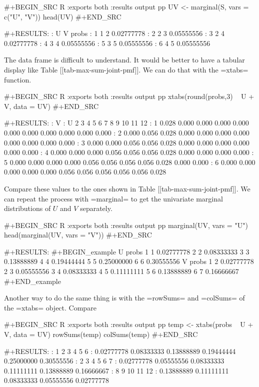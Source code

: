 #+BEGIN_SRC R :exports both :results output pp 
UV <- marginal(S, vars = c("U", "V"))
head(UV)
#+END_SRC

#+RESULTS:
:   U V      probs
: 1 1 2 0.02777778
: 2 2 3 0.05555556
: 3 2 4 0.02777778
: 4 3 4 0.05555556
: 5 3 5 0.05555556
: 6 4 5 0.05555556

The data frame is difficult to understand. It would be better to have
a tabular display like Table [[tab-max-sum-joint-pmf]]. We can do that with
the =xtabs= function.

#+BEGIN_SRC R :exports both :results output pp 
xtabs(round(probs,3) ~ U + V, data = UV)
#+END_SRC

#+RESULTS:
:    V
: U       2     3     4     5     6     7     8     9    10    11    12
:   1 0.028 0.000 0.000 0.000 0.000 0.000 0.000 0.000 0.000 0.000 0.000
:   2 0.000 0.056 0.028 0.000 0.000 0.000 0.000 0.000 0.000 0.000 0.000
:   3 0.000 0.000 0.056 0.056 0.028 0.000 0.000 0.000 0.000 0.000 0.000
:   4 0.000 0.000 0.000 0.056 0.056 0.056 0.028 0.000 0.000 0.000 0.000
:   5 0.000 0.000 0.000 0.000 0.056 0.056 0.056 0.056 0.028 0.000 0.000
:   6 0.000 0.000 0.000 0.000 0.000 0.056 0.056 0.056 0.056 0.056 0.028

Compare these values to the ones shown in Table [[tab-max-sum-joint-pmf]]. We
can repeat the process with =marginal= to get the univariate marginal
distributions of \(U\) and \(V\) separately.

#+BEGIN_SRC R :exports both :results output pp 
marginal(UV, vars = "U")
head(marginal(UV, vars = "V"))
#+END_SRC

#+RESULTS:
#+BEGIN_example
  U      probs
1 1 0.02777778
2 2 0.08333333
3 3 0.13888889
4 4 0.19444444
5 5 0.25000000
6 6 0.30555556
  V      probs
1 2 0.02777778
2 3 0.05555556
3 4 0.08333333
4 5 0.11111111
5 6 0.13888889
6 7 0.16666667
#+END_example

Another way to do the same thing is with the =rowSums= and =colSums=
of the =xtabs= object. Compare

#+BEGIN_SRC R :exports both :results output pp 
temp <- xtabs(probs ~ U + V, data = UV)
rowSums(temp)
colSums(temp)
#+END_SRC

#+RESULTS:
:          1          2          3          4          5          6 
: 0.02777778 0.08333333 0.13888889 0.19444444 0.25000000 0.30555556
:          2          3          4          5          6          7
: 0.02777778 0.05555556 0.08333333 0.11111111 0.13888889 0.16666667 
:          8          9         10         11         12
: 0.13888889 0.11111111 0.08333333 0.05555556 0.02777778

